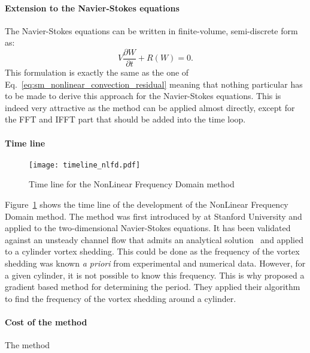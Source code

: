 \paragraph{Extension to the Navier-Stokes equations}
The Navier-Stokes equations can be written in finite-volume,
semi-discrete form as:
\begin{equation}
	V \frac{\partial W}{\partial t} + R(W) = 0.
	\label{eq:navier_stokes_fv_sd}
\end{equation}
This formulation is exactly the same as the one of 
Eq.~\ref{eq:sm_nonlinear_convection_residual} meaning that
nothing particular has to be made to derive this approach for
the Navier-Stokes equations. This is indeed very attractive as the
method can be applied almost directly, except for the FFT and IFFT
part that should be added into the time loop.

\paragraph{Time line}
\begin{figure}[htbp]
  \centering
  \texttt{[image: timeline\_nlfd.pdf]}
  \caption{Time line for the NonLinear Frequency Domain method}
  \label{fig:timeline_nlfd}
\end{figure}
Figure~\ref{fig:timeline_nlfd} shows the time line of the
development of the NonLinear Frequency Domain method.
The method was first introduced by \citet{McMullen2001}
at Stanford University and applied to the two-dimensional
Navier-Stokes equations. It has been validated against an
unsteady channel flow that admits an analytical 
solution~\cite{Merkle1987} and applied to a cylinder
vortex shedding. This could be done as the frequency of the
vortex shedding was known \textit{a priori} from experimental
and numerical data. However, for a given cylinder, it is not
possible to know this frequency. This is why \citet{McMullen2002}
proposed a gradient based method for determining the period.
They applied their algorithm to find the frequency of the vortex
shedding around a cylinder. 

\paragraph{Cost of the method}
The method 